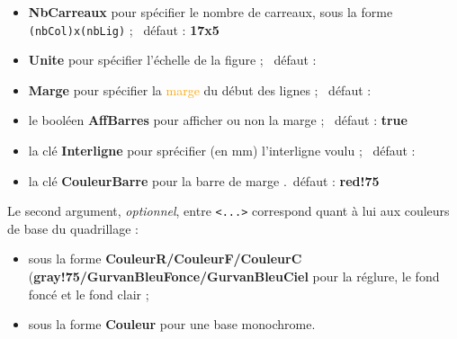 \documentclass[a4paper]{article}
\newcommand\Cle[1]{{\bfseries\sffamily\textlangle #1\textrangle}}
\begin{document}
\begin{itemize}
	\item \Cle{NbCarreaux} pour spécifier le nombre de carreaux, sous la forme \texttt{(nbCol)x(nbLig)} ; \hfill~défaut : \Cle{17x5}
	\item \Cle{Unite} pour spécifier l'échelle de la figure ; \hfill~défaut : \Cle{1}
	\item \Cle{Marge} pour spécifier la \textcolor{orange}{marge} du début des lignes ; \hfill~défaut : \Cle{4}
	\item le booléen \Cle{AffBarres} pour afficher ou non la marge ; \hfill~défaut : \Cle{true}
	\item la clé \Cle{Interligne} pour sprécifier (en mm) l'interligne voulu ; \hfill~défaut : \Cle{3}
	\item la clé \Cle{CouleurBarre} pour la barre de marge .\hfill~défaut : \Cle{red!75}
\end{itemize}

Le second argument, \textit{optionnel}, entre \texttt{<...>} correspond quant à lui aux couleurs de base du quadrillage :

\begin{itemize}
	\item sous la forme \Cle{CouleurR/CouleurF/CouleurC} (\Cle{gray!75/GurvanBleuFonce/GurvanBleuCiel} pour la réglure, le fond foncé et le fond clair ;
	\item sous la forme \Cle{Couleur} pour une base monochrome.
\end{itemize}

\medskip

\begin{PresentationCode}{}
\begin{EnvGurvan}
\end{EnvGurvan}
\end{PresentationCode}

\begin{PresentationCode}{}
\begin{EnvGurvan}[NbCarreaux=14x3,Interligne=2,Marge=2]
\end{EnvGurvan}
\end{PresentationCode}
\end{document}
